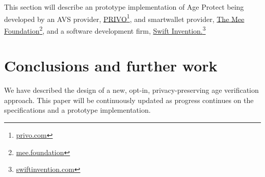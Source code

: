 \documentclass[11pt, oneside]{article}   	%
\newcommand{\hyperfootnote}[1][]{\def\ArgI{{#1}}\hyperfootnoteRelay}
\newcommand\hyperfootnoteRelay[2][]{\href{#1#2}{\ArgI}\footnote{\href{#1#2}{#2}}}
\begin{document}
This section will describe an prototype implementation of Age Protect being developed by an AVS provider, \hyperfootnote[PRIVO][https://]{privo.com}, and smartwallet provider, \hyperfootnote[The Mee Foundation][https://]{mee.foundation}, and a software development firm, \hyperfootnote[Swift Invention.][https://]{swiftinvention.com}

\section{Conclusions and further work}
We have described the design of a new, opt-in, privacy-preserving age verification approach. This paper will be continuously updated as progress continues on the specifications and a prototype implementation.



\end{document}
